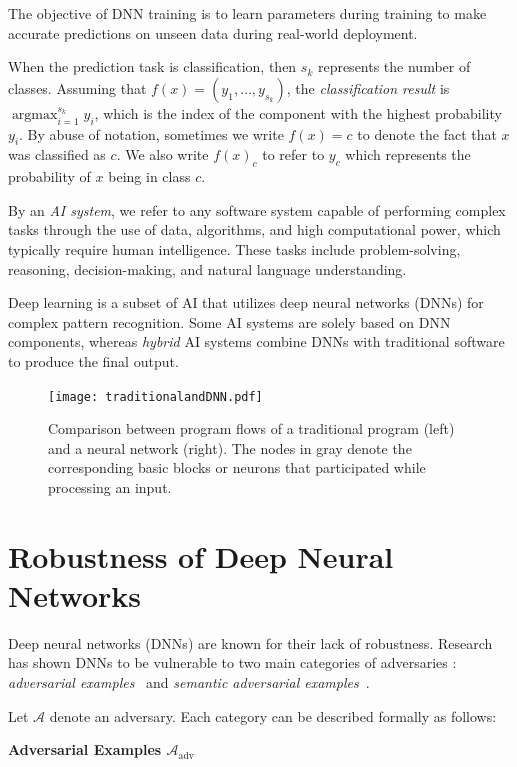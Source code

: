 The objective of DNN training is to learn parameters during training to make accurate predictions on unseen data during real-world deployment.

When the prediction task is classification, then $s_k$ represents the number of classes. Assuming that $f(x) = (y_1,\dots,y_{s_k})$, the \emph{classification result} is $\displaystyle\mathop{\text{argmax}}_{i=1}^{s_k} y_i$, which is the index of the component with the highest probability $y_i$. By abuse of notation, sometimes we write $f(x)=c$ to denote the fact that $x$ was classified as $c$. We also write $f(x)_c$ to refer to $y_c$ which represents the probability of $x$ being in class $c$.

By an \emph{AI system}, we refer to any software system capable of performing complex tasks through the use of data, algorithms, and high computational power, which typically require human intelligence. These tasks include problem-solving, reasoning, decision-making, and natural language understanding.

Deep learning is a subset of AI that utilizes deep neural networks (DNNs) for complex pattern recognition. Some AI systems are solely based on DNN components, whereas \emph{hybrid} AI systems combine DNNs with traditional software to produce the final output.

\begin{figure}
    \centering
    \texttt{[image: traditionalandDNN.pdf]}
    \caption{Comparison between program flows of a traditional program (left) and a neural network (right). The nodes in gray denote the corresponding basic blocks or neurons that participated while processing an input.}
    \label{fig:graph}
\end{figure}

\section{Robustness of Deep Neural Networks}

Deep neural networks (DNNs) are known for their lack of robustness. Research has shown DNNs to be vulnerable to two main categories of adversaries \cite{Hosseini}: \emph{adversarial examples}~\cite{adv_attacks} and \emph{semantic adversarial examples}~\cite{deeptest}.

Let $\mathcal{A}$ denote an adversary. Each category can be described formally as follows:

\smallskip\noindent%
\textbf{Adversarial Examples $\mathcal{A}_{\text{adv}}$}

